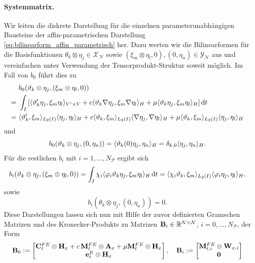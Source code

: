 \documentclass[../main.tex]{subfiles}
\begin{document}
\paragraph{Systemmatrix.} %
\label{par:systemmatrix}

Wir leiten die diskrete Darstellung für die einzelnen parameterunabhängigen Bausteine der affin-parametrischen Darstellung \cref{eq:bilinearform_affin_parametrisch} her.
Dazu werten wir die Bilinearformen für die Basisfunktionen $\theta_{k} \otimes \eta_{j} \in \mathcal X_{\mathcal N}$ sowie $(\xi_{m} \otimes \eta_{l}, 0), (0, \eta_{n}) \in \mathcal Y_{\mathcal N}$ aus und vereinfachen unter Verwendung der Tensorprodukt-Struktur soweit möglich.
Im Fall von $b_{0}$ führt dies zu
\begin{align}
    \phantom{=}&~ b_{0}(\vartheta_{k} \otimes \eta_{j}, (\xi_{m} \otimes \eta_{l}, 0))
    \\=&~ \int_{I} \left[ \langle\vartheta_{k}' \eta_{j},\xi_{m} \eta_{l}\rangle_{V' \times V} + c \langle\vartheta_{k} \nabla \eta_{j},\xi_{m} \nabla \eta_{l}\rangle_{H} + \mu \langle\vartheta_{k} \eta_{j},\xi_{m} \eta_{l}\rangle_{H} \right] \mathop{}\!\mathrm{d} t
    \\=&~ \langle\vartheta_{k}',\xi_{m}\rangle_{L_{2}(I)} \langle\eta_{j},\eta_{l}\rangle_{H} + c \langle\vartheta_{k},\xi_{m}\rangle_{L_{2}(I)}\langle\nabla \eta_{j},\nabla \eta_{l}\rangle_{H} + \mu \langle\vartheta_{k},\xi_{m}\rangle_{L_{2}(I)} \langle\eta_{j},\eta_{l}\rangle_{H}
\end{align}
und
\begin{equation}
    b_{0}(\vartheta_{k} \otimes \eta_{j}, (0, \eta_{n}))
    = \langle\vartheta_{k}(0) \eta_{j},\eta_{n}\rangle_{H}
    = \delta_{k, 0} \langle\eta_{j},\eta_{n}\rangle_{H}.
\end{equation}
Für die restlichen $b_{i}$ mit $i = 1, \dots, N_{\mathcal P}$ ergibt sich
\begin{equation}
    b_{i}(\vartheta_{k} \otimes \eta_{j}, (\xi_{m} \otimes \eta_{l}, 0))
    = \int_{I} \chi_{i} \langle\varphi_{i} \vartheta_{k} \eta_{j},\xi_{m} \eta_{l}\rangle_{H} \mathop{}\!\mathrm{d} t
    = \langle\chi_{i} \vartheta_{k},\xi_{m}\rangle_{L_{2}(I)} \langle\varphi_{i} \eta_{j},\eta_{l}\rangle_{H}.
\end{equation}
sowie
\begin{equation}
    b_{i}(\theta_{k} \otimes \eta_{j}, (0, \eta_{n})) = 0.
\end{equation}
Diese Darstellungen lassen sich nun mit Hilfe der zuvor definierten Gramschen Matrizen und des Kronecker-Produkts zu Matrizen $\mathbf{B}_{i} \in \mathbb{R}^{\mathcal N \times \mathcal N}$, $i = 0, \dots, N_{\mathcal P}$, der Form
\begin{equation}
    \mathbf{B}_{0} := \begin{bmatrix}
    \mathbf{C}_{t}^{FE} \otimes \mathbf{H}_{x} + c\,\mathbf{M}_{t}^{FE} \otimes \mathbf{A}_{x} + \mu \mathbf{M}_{t}^{FE} \otimes \mathbf{H}_{x} \\
    \mathbf{e}_{t}^{E} \otimes \mathbf{H}_{x}
    \end{bmatrix},
    \quad
    \mathbf{B}_{i} :=  \begin{bmatrix}
    \mathbf{M}_{t,i}^{FE} \otimes \mathbf{W}_{x,i} \\
    \mathbf{0}
    \end{bmatrix}
\end{equation}
\end{document}
